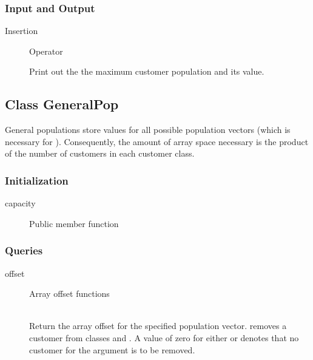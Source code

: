 \subsubsection{Input and Output}
\label{sec:population-io}
\begin{description}
\item[Insertion] \texonly{---} Operator\\

  Print out the the maximum customer population
   and its value.
\end{description}

\subsection{Class GeneralPop}
\label{sec:general-population}

General populations store values for all possible population vectors
(which is necessary for ).
Consequently, the amount of array space necessary is the product of
the number of customers in each customer class.  

\subsubsection{Initialization}
\begin{description}
\item[capacity] \texonly{---} Public member function\\
\end{description}

\subsubsection{Queries}

\begin{description}

\item[offset] \texonly{---} Array offset functions\\
  \\

  Return the array offset for the specified population vector.
   removes a customer from classes  and
  .  A value of zero for either  or  denotes that
  no customer for the argument is to be removed.

\end{description}

